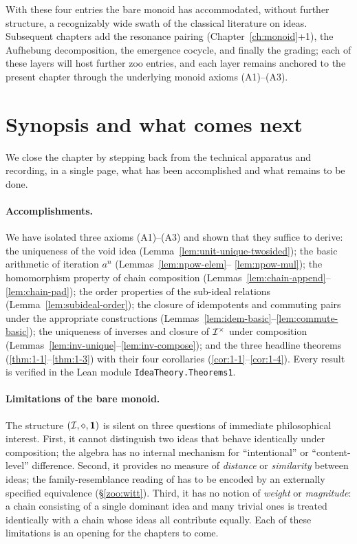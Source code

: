 \medskip

\noindent
With these four entries the bare monoid has accommodated, without further
structure, a recognizably wide swath of the classical literature on
ideas.  Subsequent chapters add the resonance pairing
(Chapter~\ref{ch:monoid}+1), the Aufhebung decomposition, the emergence
cocycle, and finally the grading; each of these layers will host further
zoo entries, and each layer remains anchored to the present chapter
through the underlying monoid axioms (A1)--(A3).

\section{Synopsis and what comes next}\label{sec:synopsis}

We close the chapter by stepping back from the technical apparatus and
recording, in a single page, what has been accomplished and what remains
to be done.

\paragraph{Accomplishments.}
We have isolated three axioms (A1)--(A3) and shown that they suffice to
derive: the uniqueness of the void idea (Lemma~\ref{lem:unit-unique-twosided});
the basic arithmetic of iteration $a^n$ (Lemmas~\ref{lem:npow-elem}--%
\ref{lem:npow-mul}); the homomorphism property of chain composition
(Lemmas~\ref{lem:chain-append}--\ref{lem:chain-pad}); the order
properties of the sub-ideal relations (Lemma~\ref{lem:subideal-order});
the closure of idempotents and commuting pairs under the appropriate
constructions (Lemmas~\ref{lem:idem-basic}--\ref{lem:commute-basic}); the
uniqueness of inverses and closure of $\mathcal{I}^{\times}$ under composition
(Lemmas~\ref{lem:inv-unique}--\ref{lem:inv-compose}); and the three
headline theorems (\ref{thm:1-1}--\ref{thm:1-3}) with their four
corollaries (\ref{cor:1-1}--\ref{cor:1-4}).  Every result is verified in
the Lean module \texttt{IdeaTheory.Theorems1}.

\paragraph{Limitations of the bare monoid.}
The structure $(\mathcal{I},\mathbin{\diamond},\mathbf{1})$ is silent on three questions of immediate
philosophical interest.  First, it cannot distinguish two ideas that
behave identically under composition; the algebra has no internal
mechanism for ``intentional'' or ``content-level'' difference.  Second,
it provides no measure of \emph{distance} or \emph{similarity} between
ideas; the family-resemblance reading of \cite{Wittgenstein1953} has to
be encoded by an externally specified equivalence
(\S\ref{zoo:witt}).  Third, it has no notion of \emph{weight} or
\emph{magnitude}: a chain consisting of a single dominant idea and many
trivial ones is treated identically with a chain whose ideas all
contribute equally.  Each of these limitations is an opening for the
chapters to come.

